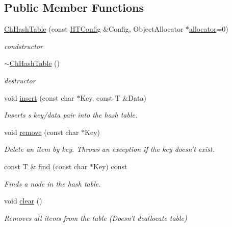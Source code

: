 \subsection*{Public Member Functions}
\begin{DoxyCompactItemize}
\item 
\hyperlink{classChHashTable_a565a189ec63f7ceb60e392774fc1d8dc}{Ch\-Hash\-Table} (const \hyperlink{structChHashTable_1_1HTConfig}{H\-T\-Config} \&Config, Object\-Allocator $\ast$\hyperlink{classChHashTable_a1c00c732ff4947ce2f79a6371db663c3}{allocator}=0)
\begin{DoxyCompactList}\small\item\em condstructor \end{DoxyCompactList}\item 
\hyperlink{classChHashTable_ac83930d62d0500c6d1f25d0a521d4ed5}{$\sim$\-Ch\-Hash\-Table} ()
\begin{DoxyCompactList}\small\item\em destructor \end{DoxyCompactList}\item 
void \hyperlink{classChHashTable_ae9cc59e33adcd5ad57f27aca449efd1b}{insert} (const char $\ast$Key, const T \&Data)
\begin{DoxyCompactList}\small\item\em Inserts s key/data pair into the hash table. \end{DoxyCompactList}\item 
void \hyperlink{classChHashTable_a3b0283888a3614af9a287da1ec84683b}{remove} (const char $\ast$Key)
\begin{DoxyCompactList}\small\item\em Delete an item by key. Throws an exception if the key doesn't exist. \end{DoxyCompactList}\item 
const T \& \hyperlink{classChHashTable_a07668ac0e4c2699fdd36b14fd123c36d}{find} (const char $\ast$Key) const 
\begin{DoxyCompactList}\small\item\em Finds a node in the hash table. \end{DoxyCompactList}\item 
void \hyperlink{classChHashTable_a30190d2a5a7644659d57ccc137c85181}{clear} ()
\begin{DoxyCompactList}\small\item\em Removes all items from the table (Doesn't deallocate table) \end{DoxyCompactList}\item 

\end{DoxyCompactItemize}
